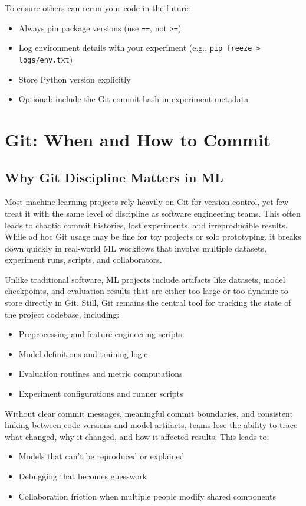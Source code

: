 \documentclass[12pt,openany]{book}
\begin{document}
To ensure others can rerun your code in the future:

\begin{itemize}
    \item Always pin package versions (use \texttt{==}, not \texttt{>=})
    \item Log environment details with your experiment (e.g., \texttt{pip freeze > logs/env.txt})
    \item Store Python version explicitly
    \item Optional: include the Git commit hash in experiment metadata
\end{itemize}




\chapter{Git: When and How to Commit}



\section{Why Git Discipline Matters in ML}

Most machine learning projects rely heavily on Git for version control, yet few treat it with the same level of discipline as software engineering teams. This often leads to chaotic commit histories, lost experiments, and irreproducible results. While ad hoc Git usage may be fine for toy projects or solo prototyping, it breaks down quickly in real-world ML workflows that involve multiple datasets, experiment runs, scripts, and collaborators. \newline

Unlike traditional software, ML projects include artifacts like datasets, model checkpoints, and evaluation results that are either too large or too dynamic to store directly in Git. Still, Git remains the central tool for tracking the state of the project codebase, including:
\begin{itemize}
    \item Preprocessing and feature engineering scripts
    \item Model definitions and training logic
    \item Evaluation routines and metric computations
    \item Experiment configurations and runner scripts
\end{itemize}

Without clear commit messages, meaningful commit boundaries, and consistent linking between code versions and model artifacts, teams lose the ability to trace what changed, why it changed, and how it affected results. This leads to:
\begin{itemize}
    \item Models that can't be reproduced or explained
    \item Debugging that becomes guesswork
    \item Collaboration friction when multiple people modify shared components
\end{itemize}
\end{document}
